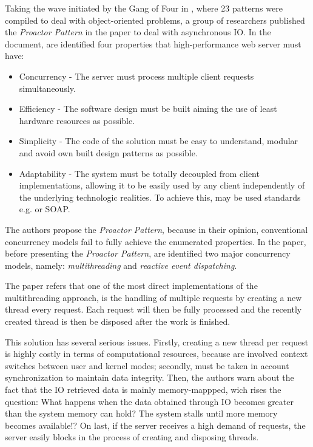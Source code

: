 Taking the wave initiated by the Gang of Four in \cite{gof}, where 23 patterns were compiled to deal with object-oriented problems, a group of researchers published the \textit{Proactor Pattern} in the paper \cite{proactor} to deal with asynchronous IO. 
In the document, are identified four properties that high-performance web server must have: 
\begin{itemize}
	\item Concurrency - The server must process multiple client requests simultaneously.\\
	\item Efficiency - The software design must be built aiming the use of least hardware resources as possible. \\
	\item Simplicity - The code of the solution must be easy to understand, modular and avoid own built design patterns as possible. \\
    \item Adaptability - The system must be totally decoupled from client implementations, allowing it to be easily used by any client independently of the underlying technologic realities. To achieve this, may be used standards e.g. \cite{REST} or SOAP.\\
\end{itemize}

The authors propose the \textit{Proactor Pattern}, because in their opinion, conventional concurrency models fail to fully achieve the enumerated properties. In the paper, before presenting the \textit{Proactor Pattern}, are identified two major concurrency models, namely: \textit{multithreading} and \textit{reactive event dispatching}. 

The paper refers that one of the most direct implementations of the multithreading approach, is the handling of multiple requests by creating a new thread every request. Each request will then be fully processed and the recently  created thread is then be disposed after the work is finished. 

This solution has several serious issues. Firstly, creating a new thread per request is highly costly in terms of computational resources,
because are involved context switches between user and kernel modes; secondly, must be taken in account synchronization to maintain data integrity.
Then, the authors warn about the fact that the IO retrieved data is mainly memory-mappped, wich rises the question: What happens when the data obtained through IO becomes greater than the system memory can hold? The system stalls until more memory becomes available!?
On last, if the server receives a high demand of requests, the server easily blocks in the process of creating and disposing threads. 

